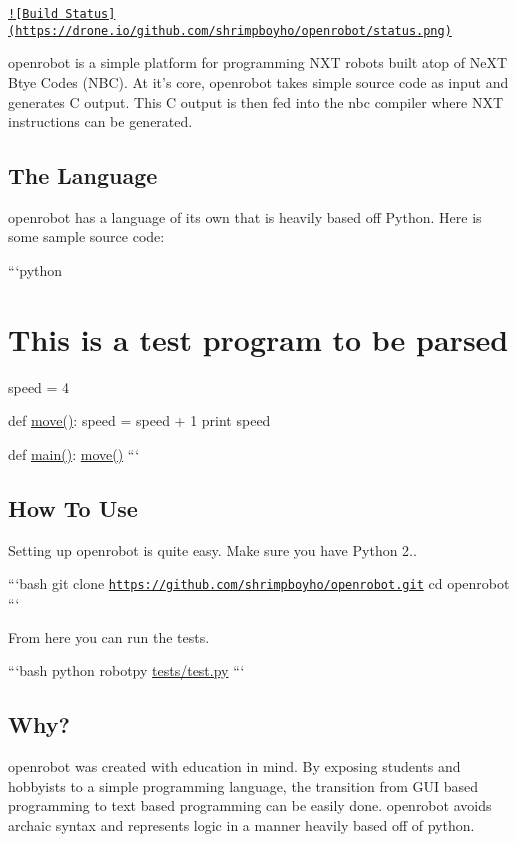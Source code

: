 \href{https://drone.io/github.com/shrimpboyho/openrobot/latest}{\tt !\mbox{[}Build Status\mbox{]}(https\-://drone.\-io/github.\-com/shrimpboyho/openrobot/status.\-png)}

{\ttfamily openrobot} is a simple platform for programming N\-X\-T robots built atop of {\ttfamily Ne\-X\-T Btye Codes} (N\-B\-C). At it's core, {\ttfamily openrobot} takes simple source code as input and generates C output. This C output is then fed into the {\ttfamily nbc} compiler where N\-X\-T instructions can be generated.

\subsection*{The Language}

{\ttfamily openrobot} has a language of its own that is heavily based off Python. Here is some sample source code\-:

```python \section*{This is a test program to be parsed}

speed = 4

def \hyperlink{output_8c_ae2b25e760e226c4f8b23bbe4eba84677}{move()}\-: speed = speed + 1 print speed

def \hyperlink{output_8c_a9a2af8e2cd81255d3bf384db4a382807}{main()}\-: \hyperlink{output_8c_ae2b25e760e226c4f8b23bbe4eba84677}{move()} ```

\subsection*{How To Use}

Setting up {\ttfamily openrobot} is quite easy. Make sure you have {\ttfamily Python 2.}.

```bash git clone \href{https://github.com/shrimpboyho/openrobot.git}{\tt https\-://github.\-com/shrimpboyho/openrobot.\-git} cd openrobot ```

From here you can run the tests.

```bash python robotpy \hyperlink{test_8py}{tests/test.\-py} ```

\subsection*{Why?}

{\ttfamily openrobot} was created with education in mind. By exposing students and hobbyists to a simple programming language, the transition from G\-U\-I based programming to text based programming can be easily done. {\ttfamily openrobot} avoids archaic syntax and represents logic in a manner heavily based off of {\ttfamily python}. 